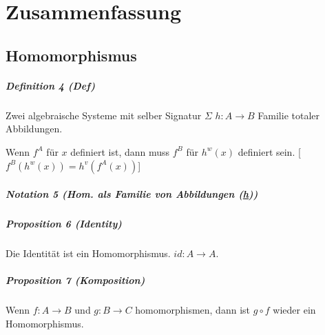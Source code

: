 




\pagestyle{scrheadings}

%

\setcounter{page}{1}
\tableofcontents 
\newpage


\setcounter{chapter}{0}
\setcounter{secnumdepth}{2}
\setcounter{page}{1} 

\chapter{Zusammenfassung}


\section{Homomorphismus}
\paragraph{Definition 4 (Def)}
Zwei algebraische Systeme mit selber Signatur $\Sigma$ $h: A \rightarrow B$ Familie totaler Abbildungen.

Wenn $f^A$ für $x$ definiert ist, dann muss $f^B$ für $h^w(x)$ definiert sein.
[$f^B(h^w(x)) = h^v(f^A(x))$]

\paragraph{Notation 5 (Hom. als Familie von Abbildungen (\underline{h}))}

\paragraph{Proposition 6 (Identity)}

Die Identität ist ein Homomorphismus. $id: A \rightarrow A$.

\paragraph{Proposition 7 (Komposition)}
Wenn $f: A \rightarrow B$ und $g: B \rightarrow C$ homomorphismen, dann ist $g \circ f$ wieder ein Homomorphismus.

